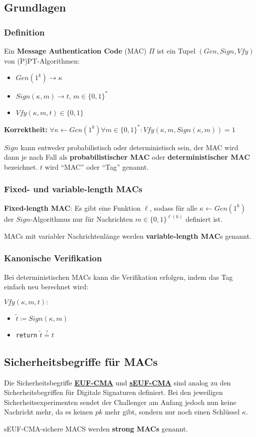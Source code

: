\documentclass[12pt,A4]{extarticle}
\newcommand{\highlight}[1]{\textcolor{highlightColor}{\textbf{#1}}}
\begin{document}
\subsection{Grundlagen}
\subsubsection{Definition}
Ein \textbf{Message Authentication Code} (MAC) $\Pi$ ist ein Tupel $(Gen, Sign, Vfy)$ von (P)PT-Algorithmen:
\begin{itemize}
  \item{$Gen(1^k) \rightarrow \kappa$}
  \item{$Sign(\kappa, m) \rightarrow t$, $m \in {\{0,1\}}^*$}
  \item{$Vfy(\kappa, m, t) \in \{0, 1\}$}
\end{itemize}
\textbf{Korrektheit:} $\forall \kappa \leftarrow Gen(1^k) \forall m \in {\{0,1\}}^*: Vfy(\kappa, m, Sign(\kappa, m)) = 1$\par
$Sign$ kann entweder probabilistisch oder deterministisch sein, der MAC wird dann je nach Fall als \textbf{probabilistischer MAC} oder \textbf{deterministischer MAC} bezeichnet. $t$ wird ``MAC'' oder ``Tag'' genannt.

\subsubsection{Fixed- und variable-length MACs}
\highlight{Fixed-length MAC}: Es gibt eine Funktion $\ell$, sodass für alle $\kappa \leftarrow Gen(1^k)$ der $Sign$-Algorithmus nur für Nachrichten $m \in {\{0,1\}}^{\ell(k)}$ definiert ist.\par
MACs mit variabler Nachrichtenlänge werden \highlight{variable-length MAC}s genannt.

\subsubsection{Kanonische Verifikation}\label{sec:kanonischeVerifikation}
Bei deterministischen MACs kann die Verifikation erfolgen, indem das Tag einfach neu berechnet wird:\par
$Vfy(\kappa, m, t):$
\begin{itemize}
  \item{$\tilde{t} \coloneqq Sign(\kappa, m)$}
  \item{\texttt{return} $\tilde{t} \stackrel{?}{=} t$}
\end{itemize}

\subsection{Sicherheitsbegriffe für MACs}
Die Sicherheitsbegriffe \hyperref[sec:euf-cma]{\textbf{EUF-CMA}} und \hyperref[sec:sEUF-CMA]{\textbf{sEUF-CMA}} sind analog zu den Sicherheitsbegriffen für Digitale Signaturen definiert.
Bei den jeweiligen Sicherheitsexperimenten sendet der Challenger am Anfang jedoch nun keine Nachricht mehr, da es keinen $pk$ mehr gibt, sondern nur noch einen Schlüssel $\kappa$.\par
sEUF-CMA-sichere MACS werden \highlight{strong MACs} genannt.
\end{document}
